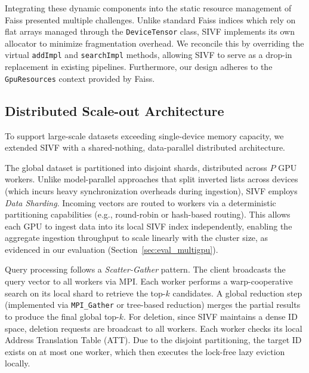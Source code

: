 \documentclass[sigconf,nonacm]{acmart}
\theoremstyle{plain}
\theoremstyle{definition}
\theoremstyle{remark}
\begin{document}
Integrating these dynamic components into the static resource management of Faiss presented multiple challenges. Unlike standard Faiss indices which rely on flat arrays managed through the \texttt{DeviceTensor} class, SIVF implements its own allocator to minimize fragmentation overhead. We reconcile this by overriding the virtual \texttt{addImpl} and \texttt{searchImpl} methods, allowing SIVF to serve as a drop-in replacement in existing pipelines. Furthermore, our design adheres to the \texttt{GpuResources} context provided by Faiss. 

\subsection{Distributed Scale-out Architecture}
\label{sec:distributed_arch}

To support large-scale datasets exceeding single-device memory capacity, we extended SIVF with a shared-nothing, data-parallel distributed architecture. 

The global dataset is partitioned into disjoint shards, distributed across $P$ GPU workers. Unlike model-parallel approaches that split inverted lists across devices (which incurs heavy synchronization overheads during ingestion), SIVF employs \textit{Data Sharding}. Incoming vectors are routed to workers via a deterministic partitioning capabilities (e.g., round-robin or hash-based routing). This allows each GPU to ingest data into its local SIVF index independently, enabling the aggregate ingestion throughput to scale linearly with the cluster size, as evidenced in our evaluation (Section~\ref{sec:eval_multigpu}).

Query processing follows a \textit{Scatter-Gather} pattern. The client broadcasts the query vector to all workers via MPI. Each worker performs a warp-cooperative search on its local shard to retrieve the top-$k$ candidates. A global reduction step (implemented via \texttt{MPI\_Gather} or tree-based reduction) merges the partial results to produce the final global top-$k$. 
For deletion, since SIVF maintains a dense ID space, deletion requests are broadcast to all workers. Each worker checks its local Address Translation Table (ATT). Due to the disjoint partitioning, the target ID exists on at most one worker, which then executes the lock-free lazy eviction locally.
\end{document}
